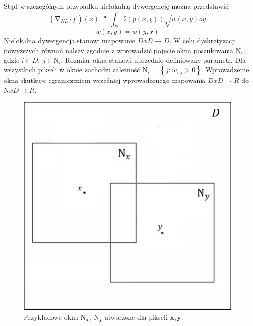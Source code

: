 \documentclass[12pt, twoside, openany]{report}
\theoremstyle{definition}
\begin{document}
Stąd w szczególnym przypadku nielokalną dywergencję można przedstawić: 
\begin{equation}
({\mathrm{\nabla }}_{NL}\cdot \overrightarrow{p})(x)\ \triangleq \int_D{2\left(p\left(x,y\right)\right)\sqrt{w(x,y)}dy}
\label{NLDIVSMART}
\end{equation}
\begin{equation}
w(x,y) = w(y,x)
\label{SMARTWEIGHT}
\end{equation}
Nielokalna dywergencja stanowi mapowanie $DxD\longrightarrow D$.
W celu dyskretyzacji powyższych równań należy zgodnie z \cite{gilboa2008nonlocal} wprowadzić pojęcie okna poszukiwania ${\mathrm{N}}_i$, gdzie $i\in D,\ j\in {\mathrm{N}}_i$. Rozmiar okna stanowi uprzednio definiowany parametr. Dla wszystkich pikseli w oknie zachodzi zależność ${\mathrm{N}}_i\coloneqq \left\{j:w_{i,j}>0\right\}$. Wprowadzenie okna skutkuje ograniczeniem wcześniej wprowadzonego mapowania $DxD\longrightarrow R$ do $\mathrm{N}xD\longrightarrow R$.
\begin{figure}[!h]
	\centering
	\includegraphics[scale=0.5]{rysunki/3_fig4.png}
	\caption{Przykładowe okna ${\boldsymbol{\mathrm{N}}}_{\boldsymbol{x}}\boldsymbol{,\ }{\boldsymbol{\mathrm{N}}}_{\boldsymbol{y}}$ utworzone dla pikseli $\boldsymbol{x},\boldsymbol{y}$.}
	\label{3_fig4}
\end{figure}
\par
\end{document}
